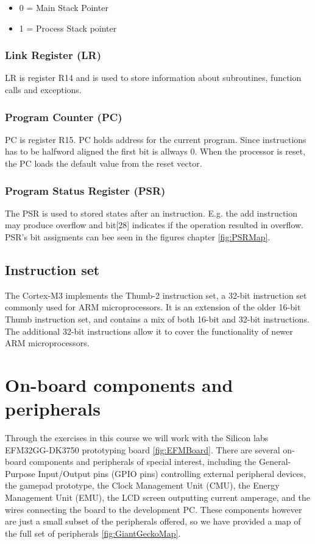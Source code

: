 \begin{itemize}
\item 0 = Main Stack Pointer
\item 1 = Process Stack pointer
\end{itemize}

\subsubsection{Link Register (LR)}
LR is register R14 and is used to store information about subroutines, function calls and exceptions.

\subsubsection{Program Counter (PC)}
PC is register R15. PC holds address for the current program. Since instructions has to be halfword aligned the first bit is allways 0. When the processor is reset, the PC loads the default value from the reset vector. 

\subsubsection{Program Status Register (PSR)}
The PSR is used to stored states after an instruction. E.g. the add instruction may produce overflow and bit[28] indicates if the operation resulted in overflow. PSR's bit assigments can bee seen in the figures chapter \ref{fig:PSRMap}.

\subsection{Instruction set}
The Cortex-M3 implements the Thumb-2 instruction set, a 32-bit instruction set commonly used for ARM microprocessors. It is an extension of the older 16-bit Thumb instruction set, and contains a mix of both 16-bit and 32-bit instructions. The additional 32-bit instructions allow it to cover the functionality of newer ARM microprocessors.\cite{CortexA8-RM}



\section{On-board components and peripherals}

Through the exercises in this course we will work with the  Silicon labs EFM32GG-DK3750 prototyping board \ref{fig:EFMBoard}. There are several on-board components and peripherals of special interest, including the General-Purpose Input/Output pins (GPIO pins) controlling external peripheral devices, the gamepad prototype, the Clock Management Unit (CMU), the Energy Management Unit (EMU), the LCD screen outputting current amperage, and the wires connecting the board to the development PC. These components however are just a small subset of the peripherals offered, so we have provided a map of the full set of peripherals \ref{fig:GiantGeckoMap}.


